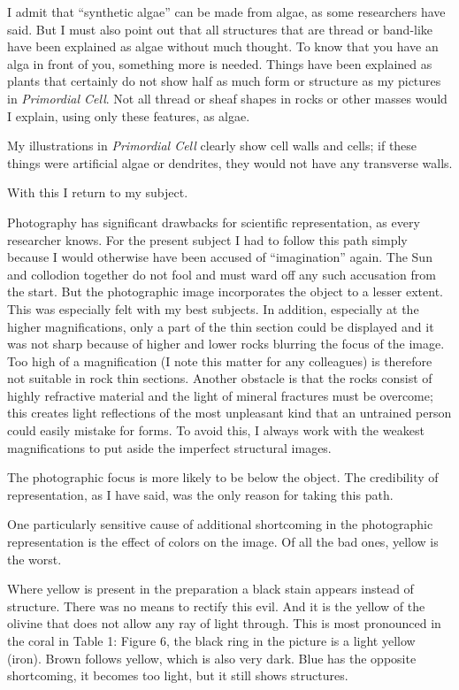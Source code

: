 \documentclass[a4paper, 12pt, oneside]{article}
\begin{document}
I admit that ``synthetic algae'' can be made from algae, as some researchers have said. But I must also point out that all structures that are thread or band-like have been explained as algae without much thought. To know that you have an alga in front of you, something more is needed. Things have been explained as plants that certainly do not show half as much form or structure as my pictures in \emph{Primordial Cell}. Not all thread or sheaf shapes in rocks or other masses would I explain, using only these features, as algae.

My illustrations in \emph{Primordial Cell} clearly show cell walls and cells; if these things were artificial algae or dendrites, they would not have any transverse walls.

With this I return to my subject.

Photography has significant drawbacks for scientific representation, as every researcher knows. For the present subject I had to follow this path simply because I would otherwise have been accused of ``imagination'' again. The Sun and collodion together do not fool and must ward off any such accusation from the start. But the photographic image incorporates the object to a lesser extent. This was especially felt with my best subjects. In addition, especially at the higher magnifications, only a part of the thin section could be displayed and it was not sharp because of higher and lower rocks blurring the focus of the image. Too high of a magnification (I note this matter for any colleagues) is therefore not suitable in rock thin sections. Another obstacle is that the rocks consist of highly refractive material and the light of mineral fractures must be overcome; this creates light reflections of the most unpleasant kind that an untrained person could easily mistake for forms. To avoid this, I always work with the weakest magnifications to put aside the imperfect structural images.

The photographic focus is more likely to be below the object. The credibility of representation, as I have said, was the only reason for taking this path.

One particularly sensitive cause of additional shortcoming in the photographic representation is the effect of colors on the image. Of all the bad ones, yellow is the worst.

Where yellow is present in the preparation a black stain appears instead of structure. There was no means to rectify this evil. And it is the yellow of the olivine that does not allow any ray of light through. This is most pronounced in the coral in Table 1: Figure 6, the black ring in the picture is a light yellow (iron). Brown follows yellow, which is also very dark. Blue has the opposite shortcoming, it becomes too light, but it still shows structures.
\end{document}
